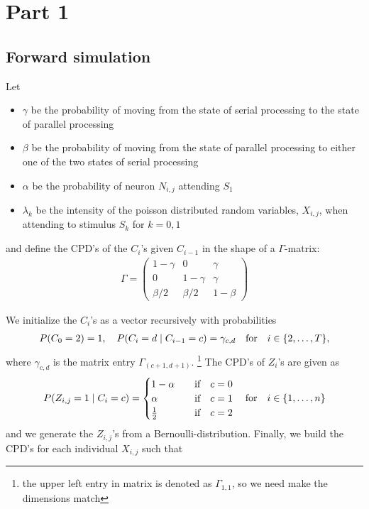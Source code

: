 \section{Part 1}

\subsection{Forward simulation}
Let 
\begin{itemize}
    \item $\gamma$ be the probability of moving from the state of serial processing to the state of parallel processing
    \item $\beta$ be the probability of moving from the state of parallel processing to either one of the two states of serial processing
    \item $\alpha$ be the probability of neuron $N_{i,j}$ attending $S_1$
    \item $\lambda_k$ be the intensity of the poisson distributed random variables, $X_{i,j}$, when attending to stimulus $S_k$  for $k = 0,1$
\end{itemize}
and define the CPD's of the $C_i$'s given $C_{i-1}$ in the shape of a $\Gamma$-matrix:
\begin{align*}
    \Gamma = \begin{pmatrix}
        1- \gamma & 0 & \gamma\\
        0 & 1- \gamma & \gamma\\
        \beta/2 & \beta/2 & 1-\beta
    \end{pmatrix}
\end{align*}

We initialize the $C_i$'s as a vector recursively with probabilities
\begin{align*}
    P(C_0 = 2 )= 1, \quad 
    P(C_i  = d \mid C_{i-1} = c) = \gamma_{c,d} \quad \text{for}\quad i\in \{2,\ldots, T\},
\end{align*}
where $\gamma_{c,d}$ is the matrix entry $\Gamma_{(c+1, d+1)}$. \footnote{the upper left entry in matrix is denoted as $\Gamma_{1,1}$, so we need make the dimensions match} The CPD's of $Z_i$'s are given as
\begin{align*}
    P(Z_{i,j} = 1 \mid C_i = c) = \begin{cases}
        1- \alpha & \quad \text{if} \quad c = 0\\
        \alpha & \quad \text{if} \quad c = 1\\
        \frac{1}{2} &\quad \text{if} \quad c =2
    \end{cases} \quad \text{for}\quad i \in \{1, \ldots, n\}
\end{align*}
and we generate the $Z_{i,j}$'s from a Bernoulli-distribution. Finally, we build the CPD's for each individual $X_{i,j}$ such that

